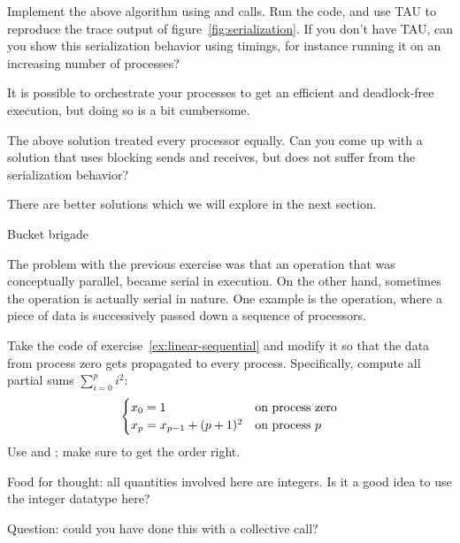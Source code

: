 \begin{exercise}
  \label{ex:linear-sequential}
  Implement the above algorithm using  and  calls.
  Run the code, and use TAU to reproduce the trace output 
  of figure~\ref{fig:serialization}.
  If you don't have TAU, can you show this serialization
  behavior using timings, for instance running it on an increasing number of processes?
\end{exercise}

It is possible to orchestrate your processes to get an efficient and
deadlock-free execution, but doing so is a bit cumbersome.

\begin{exercise}
  The above solution treated every processor equally. Can you come up
  with a solution that uses blocking sends and receives, but does not
  suffer from the serialization behavior?
\end{exercise}

There are better solutions which we will
explore in the next section.

 {Bucket brigade}
\label{sec:bucketbrigade}

The problem with the previous exercise was that an operation that was
conceptually parallel, became serial in execution. On the other hand,
sometimes the operation is actually serial in nature. One example is
the  operation, where a piece of data is
successively passed down a sequence of processors.

\begin{exercise}
  \label{ex:bucket-block}
  Take the code of exercise~\ref{ex:linear-sequential} and modify it
  so that the data from process zero gets propagated to every
  process. Specifically, compute all partial sums $\sum_{i=0}^pi^2$:
  \[ 
  \begin{cases}
    x_0 = 1&\hbox{on process zero}\\
    x_p = x_{p-1}+(p+1)^2 & \hbox{on process $p$}\\
  \end{cases}
  \]
  Use  and ; make sure to get the order right.

  Food for thought: all quantities involved here are integers. Is it a good idea to
  use the integer datatype here?

  Question: could you have done this with a collective call?
\end{exercise}

